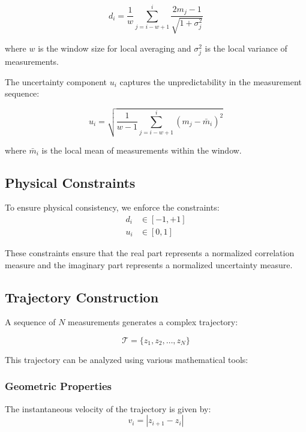 \begin{equation}
d_i = \frac{1}{w} \sum_{j=i-w+1}^{i} \frac{2m_j - 1}{\sqrt{1 + \sigma^2_j}}
\label{eq:direction}
\end{equation}

where $w$ is the window size for local averaging and $\sigma^2_j$ is the local variance of measurements.

The uncertainty component $u_i$ captures the unpredictability in the measurement sequence:

\begin{equation}
u_i = \sqrt{\frac{1}{w-1} \sum_{j=i-w+1}^{i} (m_j - \bar{m}_i)^2}
\label{eq:uncertainty}
\end{equation}

where $\bar{m}_i$ is the local mean of measurements within the window.

\subsection{Physical Constraints}

To ensure physical consistency, we enforce the constraints:
\begin{align}
d_i &\in [-1, +1] \label{eq:constraint_real}\\
u_i &\in [0, 1] \label{eq:constraint_imag}
\end{align}

These constraints ensure that the real part represents a normalized correlation measure and the imaginary part represents a normalized uncertainty measure.

\subsection{Trajectory Construction}

A sequence of $N$ measurements generates a complex trajectory:

\begin{equation}
\mathcal{T} = \{z_1, z_2, \ldots, z_N\}
\label{eq:trajectory}
\end{equation}

This trajectory can be analyzed using various mathematical tools:

\subsubsection{Geometric Properties}

The instantaneous velocity of the trajectory is given by:
\begin{equation}
v_i = |z_{i+1} - z_i|
\label{eq:velocity}
\end{equation}

